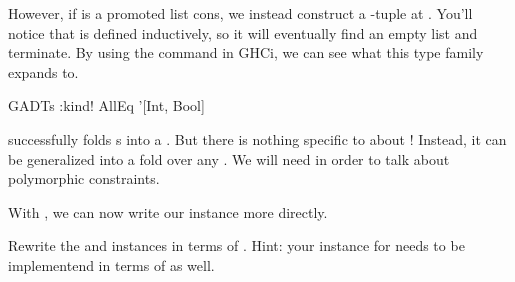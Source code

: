 \documentclass[book.tex]{subfiles}
\begin{document}
However, if  is a promoted list cons, we instead construct a
-tuple at . You'll notice that  is defined
inductively, so it will eventually find an empty list and terminate. By using
the  command in GHCi, we can see what this type family expands
to.

\begin{dorepl}{GADTs}
:kind! AllEq '[Int, Bool]
\end{dorepl}

 successfully folds \kind{[Type]}s into a . But there
is nothing specific to  about ! Instead, it can be generalized
into a fold over any  . We will need
 in order to talk about polymorphic constraints.


With , we can now write our  instance more directly.


\begin{exercise}
Rewrite the  and  instances in terms of .
Hint: your instance for  needs to be implementend in terms of 
as well.
\end{exercise}
\begin{solution}
\end{solution}
\end{document}

